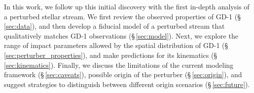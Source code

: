\documentclass[twocolumn]{aastex62}
\newcommand{\acronym}[1]{{\small{#1}}}
\newcommand{\lcdm}{\acronym{$\Lambda$CDM}}
\begin{document}
In this work, we follow up this initial discovery with the first in-depth analysis of a perturbed stellar stream.
We first review the observed properties of GD-1 (\S\,\ref{sec:data}), and then develop a fiducial model of a perturbed stream that qualitatively matches GD-1 observations (\S\,\ref{sec:model}).
Next, we explore the range of impact parameters allowed by the spatial distribution of GD-1 (\S\,\ref{sec:perturber_properties}), and make predictions for its kinematics (\S\,\ref{sec:kinematics}).
Finally, we discuss the limitations of the current modeling framework (\S\,\ref{sec:caveats}), possible origin of the perturber (\S\,\ref{sec:origin}), and suggest strategies to distinguish between different origin scenarios (\S\,\ref{sec:future}).


% 
\end{document}
